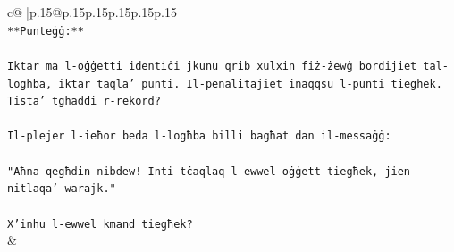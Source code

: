 \documentclass{article}
\begin{document}
{\begin{supertabular}{c@{$\;$}|p{.15\linewidth}@{}p{.15\linewidth}p{.15\linewidth}p{.15\linewidth}p{.15\linewidth}p{.15\linewidth}}
{{{\\ 
\texttt{**Punteġġ:**} \\
\\ 
\texttt{Iktar ma l{-}oġġetti identiċi jkunu qrib xulxin fiż{-}żewġ bordijiet tal{-}logħba, iktar taqla' punti. Il{-}penalitajiet inaqqsu l{-}punti tiegħek. Tista' tgħaddi r{-}rekord?} \\
\\ 
\texttt{Il{-}plejer l{-}ieħor beda l{-}logħba billi bagħat dan il{-}messaġġ:} \\
\\ 
\texttt{"Aħna qegħdin nibdew! Inti tċaqlaq l{-}ewwel oġġett tiegħek, jien nitlaqa' warajk."} \\
\\ 
\texttt{X'inhu l{-}ewwel kmand tiegħek?} \\
            }
        }
    }
    & \\ \\


\end{supertabular}}
\end{document}
